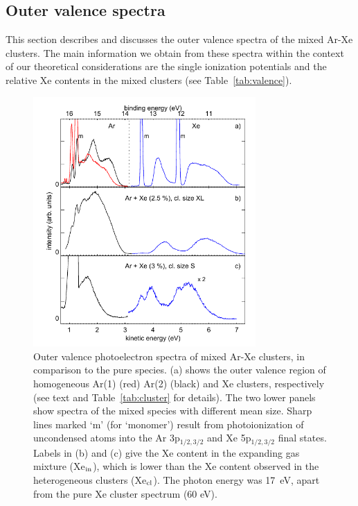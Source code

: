 \documentclass[journal=jpccck,manuscript=article]{achemso}
\begin{document}
\subsection{Outer valence spectra}
%
This section describes and discusses the outer valence spectra of the mixed
Ar-Xe clusters. The main information we obtain from these spectra within
the context of our theoretical considerations are the single ionization
potentials and the relative Xe
contents in the mixed clusters (see Table\ \ref{tab:valence}). 
%
\begin{figure}[ht]
 \centering
 \includegraphics[width=8.5cm]{figure_oval_1.pdf}
 \caption{
Outer valence photoelectron spectra of mixed Ar-Xe clusters, in comparison to the pure species. 
(a) shows the outer valence region of homogeneous Ar(1) (red) Ar(2) (black) and Xe clusters, respectively (see text and Table\ \ref{tab:cluster} for details). 
The two lower panels show spectra of the mixed species with different mean size. 
Sharp lines marked `m' (for `monomer') result from photoionization of uncondensed atoms into the Ar 3p$_{1/2,3/2}$ and Xe 5p$_{1/2,3/2}$ final states. 
Labels in (b) and (c) give the Xe content in the expanding gas mixture (Xe$_{\rm in}$), which is lower than the Xe content observed in the heterogeneous clusters (Xe$_{\rm cl}$). 
The photon energy was 17~eV, apart from the pure Xe cluster spectrum (60 eV).
}
 \label{figure:oval1}
\end{figure}
\end{document}
